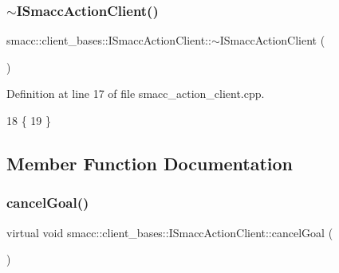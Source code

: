 \subsubsection{\texorpdfstring{$\sim$\+I\+Smacc\+Action\+Client()}{~ISmaccActionClient()}}
{\footnotesize\ttfamily smacc\+::client\+\_\+bases\+::\+I\+Smacc\+Action\+Client\+::$\sim$\+I\+Smacc\+Action\+Client (\begin{DoxyParamCaption}{ }\end{DoxyParamCaption})\hspace{0.3cm}{\ttfamily [virtual]}}



Definition at line 17 of file smacc\+\_\+action\+\_\+client.\+cpp.


\begin{DoxyCode}
18 \{
19 \}
\end{DoxyCode}


\subsection{Member Function Documentation}
\mbox{\label{classsmacc_1_1client__bases_1_1ISmaccActionClient_ac4880d5bb0e8a343d323a6c46984476d}} 
\subsubsection{\texorpdfstring{cancel\+Goal()}{cancelGoal()}}
{\footnotesize\ttfamily virtual void smacc\+::client\+\_\+bases\+::\+I\+Smacc\+Action\+Client\+::cancel\+Goal (\begin{DoxyParamCaption}{ }\end{DoxyParamCaption})\hspace{0.3cm}{\ttfamily [pure virtual]}}



